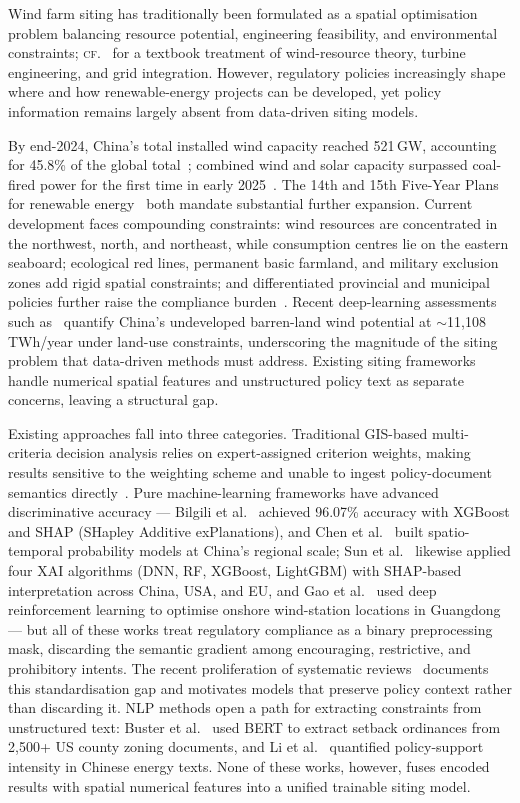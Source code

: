 \documentclass[12pt, a4paper]{article}
\begin{document}
Wind farm siting has traditionally been formulated as a
spatial optimisation problem balancing resource potential,
engineering feasibility, and environmental constraints;
\textsc{cf.~}\cite{manwell2010} for a textbook treatment of
wind-resource theory, turbine engineering, and grid
integration. However, regulatory policies increasingly shape
where and how renewable-energy projects can be developed, yet
policy information remains largely absent from data-driven
siting models.

By end-2024, China's total installed wind capacity reached
521\,GW, accounting for 45.8\% of the global
total~\cite{ruan2025,he2023}; combined wind and solar capacity
surpassed coal-fired power for the first time in early
2025~\cite{ruan2025}. The 14th and 15th Five-Year Plans for
renewable energy~\cite{ndrc2022,ndrc2026} both mandate
substantial further expansion. Current development faces
compounding constraints: wind resources are concentrated in
the northwest, north, and northeast, while consumption centres
lie on the eastern seaboard; ecological red lines, permanent
basic farmland, and military exclusion zones add rigid spatial
constraints; and differentiated provincial and municipal
policies further raise the compliance burden~\cite{zhong2022}.
Recent deep-learning assessments such as~\cite{gao2026dgclstm}
quantify China's undeveloped barren-land wind potential at
$\sim$11{,}108\,TWh/year under land-use constraints,
underscoring the magnitude of the siting problem that
data-driven methods must address.
Existing siting frameworks handle numerical spatial features
and unstructured policy text as separate concerns, leaving a
structural gap.

Existing approaches fall into three categories. Traditional
GIS-based multi-criteria decision analysis relies on
expert-assigned criterion weights, making results sensitive to
the weighting scheme and unable to ingest policy-document
semantics directly~\cite{xu2020,wu2022}. Pure machine-learning
frameworks have advanced discriminative accuracy --- Bilgili
et al.~\cite{bilgili2024} achieved 96.07\% accuracy with
XGBoost and SHAP (SHapley Additive exPlanations), and Chen
et al.~\cite{chen2026} built
spatio-temporal probability models at China's regional scale;
Sun et al.~\cite{sun2024land} likewise applied four XAI
algorithms (DNN, RF, XGBoost, LightGBM) with SHAP-based
interpretation across China, USA, and EU, and
Gao et al.~\cite{gao2025drl} used deep reinforcement learning
to optimise onshore wind-station locations in Guangdong ---
but all of these works treat regulatory compliance as a binary
preprocessing mask, discarding the semantic gradient among
encouraging, restrictive, and prohibitory intents. The recent
proliferation of systematic reviews~\cite{resch2023heliyon,jurasz2025}
documents this standardisation gap and motivates models that
preserve policy context rather than discarding it. NLP methods
open a path for extracting constraints from unstructured text:
Buster et al.~\cite{buster2024} used BERT to extract setback
ordinances from 2,500+ US county zoning documents, and Li et
al.~\cite{li2023} quantified policy-support intensity in
Chinese energy texts. None of these works, however, fuses
encoded results with spatial numerical features into a unified
trainable siting model.
\end{document}
